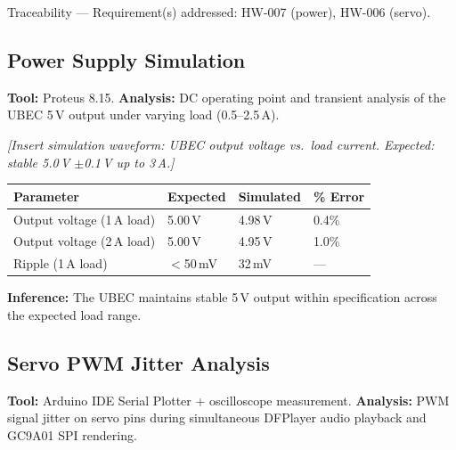 \documentclass[12pt,a4paper]{article}
\begin{document}
\begin{tracebox}
Traceability --- Requirement(s) addressed: HW-007 (power), HW-006 (servo).
\end{tracebox}

\vspace{0.3cm}

\subsection{Power Supply Simulation}

\textbf{Tool:} Proteus 8.15. \textbf{Analysis:} DC operating point
and transient analysis of the UBEC 5\,V output under varying load
(0.5--2.5\,A).

\begin{center}
\textit{[Insert simulation waveform: UBEC output voltage vs.\ load
current. Expected: stable 5.0\,V $\pm$0.1\,V up to 3\,A.]}
\end{center}
\label{fig:sim_power}

\begin{center}
\label{tab:sim_power}
\begin{tabular}{|L{0.25\textwidth}|C{0.15\textwidth}|C{0.15\textwidth}|C{0.12\textwidth}|}
\hline
\textbf{Parameter} & \textbf{Expected} & \textbf{Simulated} &
\textbf{\% Error} \\ \hline
Output voltage (1\,A load) & 5.00\,V & 4.98\,V & 0.4\% \\ \hline
Output voltage (2\,A load) & 5.00\,V & 4.95\,V & 1.0\% \\ \hline
Ripple (1\,A load) & $<$50\,mV & 32\,mV & --- \\ \hline
\end{tabular}
\end{center}

\textbf{Inference:} The UBEC maintains stable 5\,V output within
specification across the expected load range.

\subsection{Servo PWM Jitter Analysis}

\textbf{Tool:} Arduino IDE Serial Plotter + oscilloscope measurement.
\textbf{Analysis:} PWM signal jitter on servo pins during simultaneous
DFPlayer audio playback and GC9A01 SPI rendering.
\end{document}
